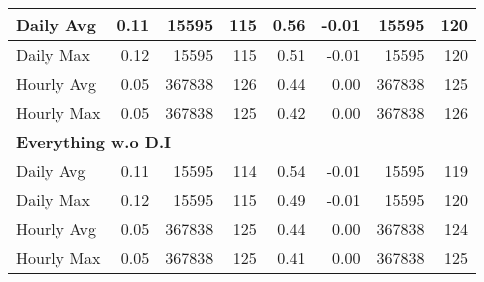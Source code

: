 \begin{tabular}{l|r|r|r|r|r|r|r}
\hline
\hspace{1em}Daily Avg & 0.11 & 15595 & 115 & 0.56 & -0.01 & 15595 & 120\\
\hline
\hspace{1em}Daily Max & 0.12 & 15595 & 115 & 0.51 & -0.01 & 15595 & 120\\
\hline
\hspace{1em}Hourly Avg & 0.05 & 367838 & 126 & 0.44 & 0.00 & 367838 & 125\\
\hline
\hspace{1em}Hourly Max & 0.05 & 367838 & 125 & 0.42 & 0.00 & 367838 & 126\\
\hline
\multicolumn{8}{l}{\textbf{Everything w.o D.I}}\\
\hline
\hspace{1em}Daily Avg & 0.11 & 15595 & 114 & 0.54 & -0.01 & 15595 & 119\\
\hline
\hspace{1em}Daily Max & 0.12 & 15595 & 115 & 0.49 & -0.01 & 15595 & 120\\
\hline
\hspace{1em}Hourly Avg & 0.05 & 367838 & 125 & 0.44 & 0.00 & 367838 & 124\\
\hline
\hspace{1em}Hourly Max & 0.05 & 367838 & 125 & 0.41 & 0.00 & 367838 & 125\\
\hline
\end{tabular}
